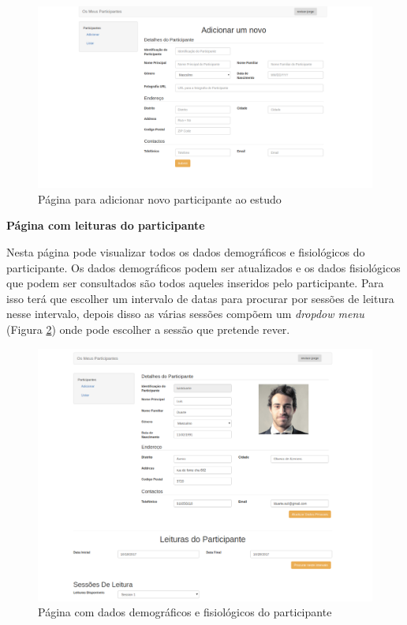 \begin{figure}[H]
\centering
\includegraphics[width=1\textwidth]{imgs/add_participant_web.png}
\caption[Página para adicionar novo participante ao estudo]{Página para adicionar novo participante ao estudo}
\label{f:web-newparticipante}
\end{figure}
\newpage

\par
\textbf{Página com leituras do participante}
\par
Nesta página pode visualizar todos os dados demográficos e fisiológicos do participante. Os dados demográficos podem ser atualizados e os dados fisiológicos que podem ser consultados são todos aqueles inseridos pelo participante. Para isso terá que escolher um intervalo de datas para procurar por sessões de leitura nesse intervalo, depois disso as várias sessões compõem um \textit{dropdow menu} (Figura \ref{f:webleiturassessoes}) onde pode escolher a sessão que pretende rever. 

\begin{figure}[H]
\centering
\includegraphics[width=1\textwidth]{imgs/user-info-web.png}
\caption[Página com dados demográficos e fisiológicos do participante]{Página com dados demográficos e fisiológicos do participante}
\label{f:webleiturassessoes}
\end{figure}

